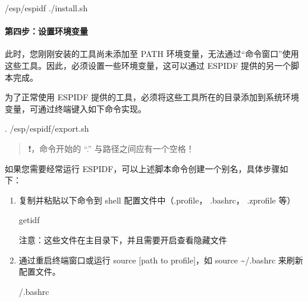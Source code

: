 \documentclass[a4paper,12pt,english]{sphinxmanual}
\begin{document}
\begin{sphinxVerbatim}[commandchars=\\\{\}]
 \PYGZti{}/esp/esp\PYGZhy{}idf
 
./install.sh
\end{sphinxVerbatim}


\paragraph{第四步：设置环境变量}
\label{\detokenize{exp-esp32/ide/esp-idf-setup:id14}}
\sphinxAtStartPar
此时，您刚刚安装的工具尚未添加至 PATH 环境变量，无法通过“命令窗口”使用这些工具。因此，必须设置一些环境变量，这可以通过 ESP\sphinxhyphen{}IDF 提供的另一个脚本完成。

\sphinxAtStartPar
为了正常使用 ESP\sphinxhyphen{}IDF 提供的工具，必须将这些工具所在的目录添加到系统环境变量，可通过终端键入如下命令实现。

\begin{sphinxVerbatim}[commandchars=\\\{\}]
. /esp/esp\PYGZhy{}idf/export.sh
\end{sphinxVerbatim}
\begin{quote}

\sphinxAtStartPar
❗，命令开始的 “.” 与路径之间应有一个空格！
\end{quote}

\sphinxAtStartPar
如果您需要经常运行 ESP\sphinxhyphen{}IDF，可以上述脚本命令创建一个别名，具体步骤如下：
\begin{enumerate}
%
\item {} 
\sphinxAtStartPar
复制并粘贴以下命令到 shell 配置文件中（.profile， .bashrc， .zprofile 等）

\begin{sphinxVerbatim}[commandchars=\\\{\}]
 get\PYGZhy{}idf
\end{sphinxVerbatim}

\sphinxAtStartPar
注意：这些文件在主目录下，并且需要开启查看隐藏文件

\sphinxAtStartPar
{}

\item {} 
\sphinxAtStartPar
通过重启终端窗口或运行 source {[}path to profile{]}，如 source \textasciitilde{}/.bashrc 来刷新配置文件。

\begin{sphinxVerbatim}[commandchars=\\\{\}]
 \PYGZti{}/.bashrc
\end{sphinxVerbatim}

\end{enumerate}
\end{document}
